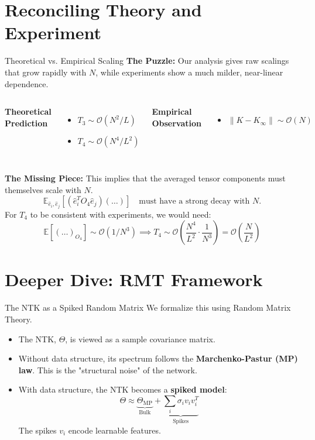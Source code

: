 \documentclass{beamer}
\newcommand{\Order}{\mathcal{O}}
\begin{document}
\section{Reconciling Theory and Experiment}

\begin{frame}{Theoretical vs. Empirical Scaling}
\textbf{The Puzzle:} Our analysis gives raw scalings that grow rapidly with $N$, while experiments show a much milder, near-linear dependence.
\begin{columns}
\textbf{Theoretical Prediction}
\begin{itemize}
    \item $T_3 \sim \Order(N^2/L)$
    \item $T_4 \sim \Order(N^4/L^2)$
\end{itemize}
\textbf{Empirical Observation}
\begin{itemize}
    \item $\|K - K_\infty\| \sim \Order(N)$
\end{itemize}
\end{columns}
\vspace{1cm}
\textbf{The Missing Piece:}
This implies that the averaged tensor components must themselves scale with $N$.
\[
\mathbb{E}_{\hat{e}_i, \hat{e}_j}[(\hat{e}_{i}^{T}O_{4}\hat{e}_{j})(\dots)] \quad \text{must have a strong decay with } N.
\]
For $T_4$ to be consistent with experiments, we would need:
\[
\mathbb{E}[(\dots)_{O_4}] \sim \Order(1/N^3) \implies T_4 \sim \Order\left(\frac{N^4}{L^2} \cdot \frac{1}{N^3}\right) = \Order\left(\frac{N}{L^2}\right)
\]
\end{frame}

\section{Deeper Dive: RMT Framework}

\begin{frame}{The NTK as a Spiked Random Matrix}
We formalize this using Random Matrix Theory.
\begin{itemize}
    \item The NTK, $\Theta$, is viewed as a sample covariance matrix.
    \item Without data structure, its spectrum follows the \textbf{Marchenko-Pastur (MP) law}. This is the "structural noise" of the network.
    \item With data structure, the NTK becomes a \textbf{spiked model}:
    \[
    \Theta \approx \underbrace{\Theta_{\text{MP}}}_{\text{Bulk}} + \underbrace{\sum_{i} \sigma_i v_i v_i^T}_{\text{Spikes}}
    \]
    The spikes $v_i$ encode learnable features.
\end{itemize}
\end{frame}
\end{document}
